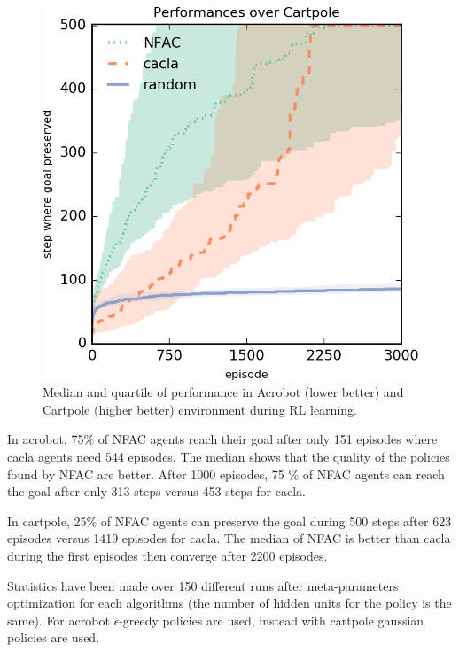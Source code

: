 \begin{figure}[h]
\begin{minipage}{.5\textwidth}
  \includegraphics[width=0.95\linewidth]{result_plotting/cartpole_perf.png}
\end{minipage}
\caption{ \label{fig:actions} Median and quartile of performance in Acrobot (lower better) and Cartpole (higher better) environment during RL learning.}
\end{figure}


In acrobot, 75\% of NFAC agents reach their goal after only 151 episodes where cacla agents need 544 episodes. The median shows that the quality
of the policies found by NFAC are better. After 1000 episodes, 75 \% of NFAC agents can reach the goal after only 313 steps versus 453 steps for cacla.

In cartpole, 25\% of NFAC agents can preserve the goal during 500 steps after 623 episodes versus 1419 episodes for cacla. The median of NFAC is better 
than cacla during the first episodes then converge after 2200 episodes.

Statistics have been made over 150 different runs after meta-parameters optimization for each algorithms
(the number of hidden units for the policy is the same).
For acrobot $\epsilon$-greedy policies are used, instead with cartpole gaussian policies are used.